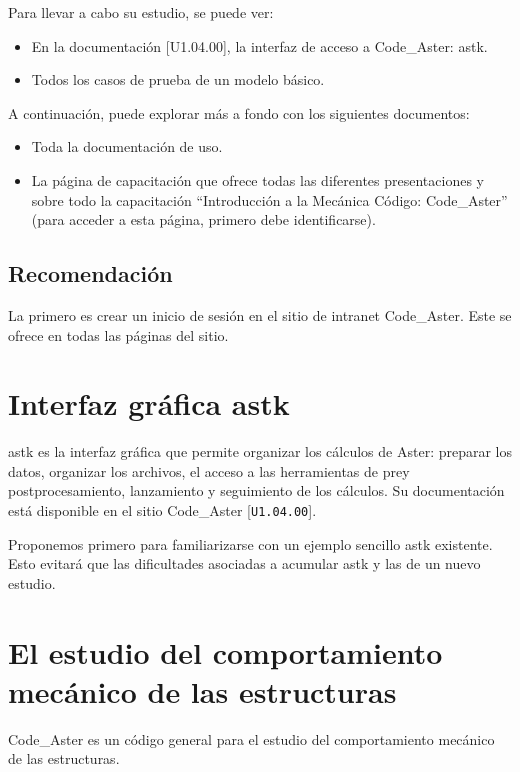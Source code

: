 \documentclass[12pt]{book}
\theoremstyle{definition}
\theoremstyle{remark}
\theoremstyle{plain}
\begin{document}
Para llevar a cabo su estudio, se puede ver:

\begin{itemize}
 \item  En la documentación [U1.04.00], la interfaz de acceso a 
Code\_Aster: astk.
 \item Todos los casos de prueba de un modelo básico.
\end{itemize}
A continuación, puede explorar más a fondo con los siguientes documentos:
\begin{itemize}
 \item Toda la documentación de uso.
 \item La página de capacitación que ofrece todas las diferentes presentaciones y 
sobre todo la capacitación ``Introducción a la Mecánica Código: Code\_Aster'' 
(para acceder a esta página, primero debe identificarse).
\end{itemize}

\subsection{Recomendación}

La primero es crear un inicio de sesión en el sitio de intranet 
Code\_Aster. Este se ofrece en todas las páginas del sitio.


\section{Interfaz gráfica astk}
astk es la interfaz gráfica que permite organizar los cálculos de Aster: preparar 
los datos, organizar los archivos, el acceso a las herramientas de pre\-y 
post\-procesamiento, lanzamiento y seguimiento de los cálculos. Su documentación 
está disponible en el sitio Code\_Aster [\verb|U1.04.00|].

Proponemos primero para familiarizarse con un ejemplo sencillo astk existente. Esto
 evitará que las dificultades asociadas a acumular astk y las de un nuevo estudio.

\section{El estudio del comportamiento mecánico de las estructuras}
Code\_Aster es un código general para el estudio del comportamiento mecánico
 de las estructuras.
\end{document}
